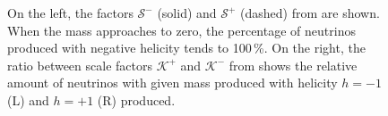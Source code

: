 \begin{figure}
	\centering
	{\resizebox{0.5\linewidth}{!}{}}
	\hspace{-1em}
	{\resizebox{0.5\linewidth}{!}{}}
	\caption[Helicity factors for production of HNL]%
		{On the left, the factors $\mathcal{S}^-$ (solid) and $\mathcal{S}^+$ (dashed) %
		from  are shown.
		When the mass approaches to zero, the percentage of neutrinos produced %
		with negative helicity tends to 100\,\%.
		On the right, the ratio between scale factors $\mathcal{K}^+$ and $\mathcal{K}^-$ %
		from  shows the relative amount of neutrinos %
		with given mass produced with helicity $h=-1$ (L) and $h=+1$ (R) produced.}
	\label{fig:helix}
\end{figure}

